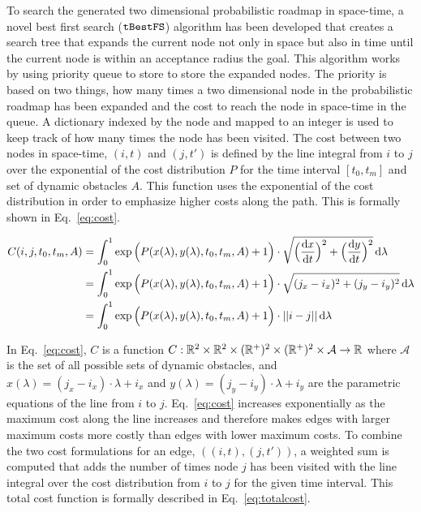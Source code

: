 To search the generated two dimensional probabilistic roadmap in space-time, a
novel best first search ($\Acronym{tBestFS}$) algorithm has been developed that
creates a search tree that expands the current node not only in space but also
in time until the current node is within an acceptance radius the goal. This
algorithm works by using priority queue to store to store the expanded nodes.
The priority is based on two things, how many times a two dimensional node in
the probabilistic roadmap has been expanded and the cost to reach the node in
space-time in the queue. A dictionary indexed by the node and mapped to an
integer is used to keep track of how many times the node has been visited. The
cost between two nodes in space-time, $(i, t)$ and $(j, t')$ is defined by the
line integral from $i$ to $j$ over the exponential of the cost distribution $P$
for the time interval $[t_0, t_m]$ and set of dynamic obstacles $A$. This
function uses the exponential of the cost distribution in order to emphasize
higher costs along the path. This is formally shown in Eq.~\ref{eq:cost}.


\begin{align}
    C(i, j, t_0, t_m, A) &= \int^1_0 \exp{\Big(
        P(x(\lambda), y(\lambda), t_0, t_m, A) + 1 \Big)
    } \cdot \sqrt{\Big(\frac{{\mathrm{d}} x}{{\mathrm{d}} t}\Big)^2
    + \Big(\frac{{\mathrm{d}} y}{{\mathrm{d}} t}\Big)^2}
    \,\mathrm{d}\lambda \notag \\
    &= \int^1_0 \exp{\Big(
        P(x(\lambda), y(\lambda), t_0, t_m, A) + 1 \Big)
    } \cdot \sqrt{(j_x - i_x)^2 + (j_y - i_y)^2}
    \,\mathrm{d}\lambda \notag \\
    &= \int^1_0 \exp{\Big(
        P(x(\lambda), y(\lambda), t_0, t_m, A) + 1 \Big)
    } \cdot ||i - j|| \,\mathrm{d}\lambda
    \label{eq:cost}
\end{align}

In Eq.~\ref{eq:cost}, $C$ is a function $C: \mathbb{R}^2 \times \mathbb{R}^2 \times (\mathbb{R}^+)^2
\times (\mathbb{R}^+)^2 \times \mathcal{A} \rightarrow \mathbb{R}$ where $\mathcal{A}$ is the
set of all possible sets of dynamic obstacles, and $x(\lambda) = (j_x - i_x)
\cdot \lambda + i_x$ and $y(\lambda) = (j_y - i_y) \cdot \lambda + i_y$ are the
parametric equations of the line from $i$ to $j$.  Eq.~\ref{eq:cost} increases
exponentially as the maximum cost along the line increases and therefore makes
edges with larger maximum costs more costly than edges with lower maximum
costs. To combine the two cost formulations for an edge, $((i, t), (j, t'))$, a
weighted sum is computed that adds the number of times node $j$ has been
visited with the line integral over the cost distribution from $i$ to $j$ for
the given time interval. This total cost function is formally described in
Eq.~\ref{eq:totalcost}.

